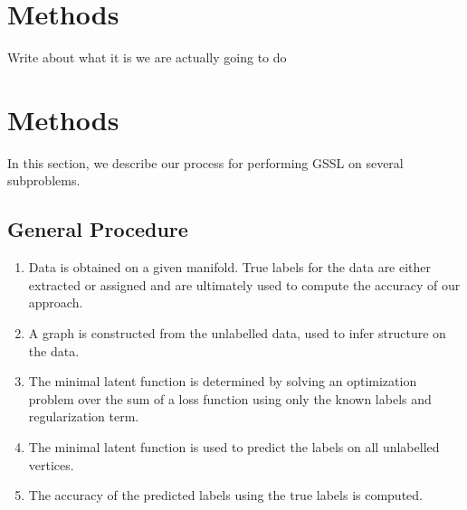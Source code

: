 \documentclass[12pt]{amsart}
\begin{document}

\section{Methods}
Write about what it is we are actually going to do

\section{Methods}
In this section, we describe our process for performing GSSL on several subproblems.

\subsection{General Procedure}
\begin{enumerate}
    \item Data is obtained on a given manifold. True labels for the data are either extracted or assigned and are ultimately used to compute the accuracy of our approach.
    \item A graph is constructed from the unlabelled data, used to infer structure on the data. 
    \item The minimal latent function is determined by solving an optimization problem over the sum of a loss function using only the known labels and regularization term.
    \item The minimal latent function is used to predict the labels on all unlabelled vertices.
    \item The accuracy of the predicted labels using the true labels is computed.
\end{enumerate}
\end{document}
